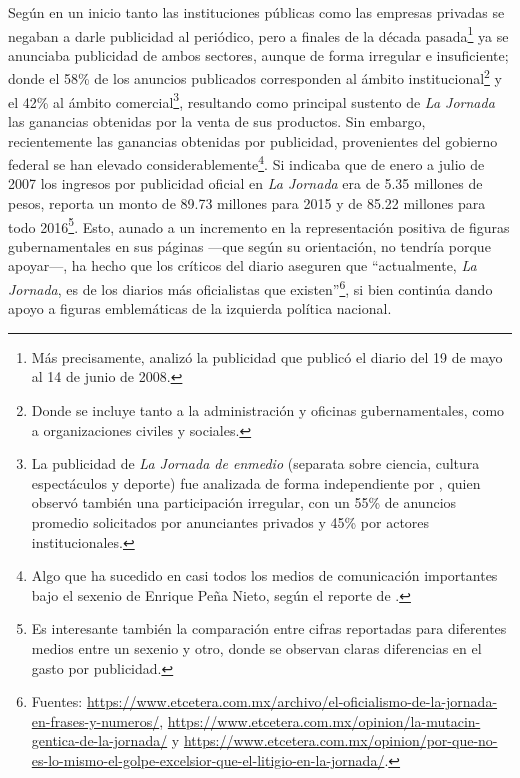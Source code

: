 \documentclass[letterpaper, 11pt]{book}
\theoremstyle{definition}
\theoremstyle{remark}
\begin{document}
Según \citet{2011_Tesis_LaJornada} en un inicio tanto las instituciones públicas como las empresas privadas se negaban a darle publicidad al periódico, pero a finales de la década pasada\footnote{
Más precisamente, \citet{2011_Tesis_LaJornada} analizó la publicidad que publicó el diario del 19 de mayo al 14 de junio de 2008.} ya se anunciaba publicidad de ambos sectores, aunque de forma irregular e insuficiente; donde el 58\% de los anuncios publicados corresponden al ámbito institucional\footnote{
Donde se incluye tanto a la administración y oficinas gubernamentales, como a organizaciones civiles y sociales.} y el 42\% al ámbito comercial\footnote{
La publicidad de \emph{La Jornada de enmedio} (separata sobre ciencia, cultura espectáculos y deporte) fue analizada de forma independiente por \citet{2011_Tesis_LaJornada}, quien observó también una participación irregular, con un 55\% de anuncios promedio solicitados por anunciantes privados y 45\% por actores institucionales.}, resultando como principal sustento de \emph{La Jornada} las ganancias obtenidas por la venta de sus productos. 
Sin embargo, recientemente las ganancias obtenidas por publicidad, provenientes del gobierno federal se han elevado considerablemente\footnote{Algo que ha sucedido en casi todos los medios de comunicación importantes bajo el sexenio de Enrique Peña Nieto, según  el reporte de \citet{2017_FUNDAR_PublicidadOficial}.}. 
Si \citet{2011_Tesis_LaJornada} indicaba que de enero a julio de 2007 los ingresos por publicidad oficial en \emph{La Jornada} era de 5.35 millones de pesos, \citet{2017_FUNDAR_PublicidadOficial} reporta un monto de 89.73 millones para 2015 y de 85.22 millones para todo 2016\footnote{Es interesante también la comparación entre cifras reportadas para diferentes medios entre un sexenio y otro, donde se observan claras diferencias en el gasto por publicidad.}. 
Esto, aunado a un incremento en la representación positiva de figuras gubernamentales en sus páginas ---que según su orientación, no tendría porque apoyar---, ha hecho que los críticos del diario aseguren que ``actualmente, \emph{La Jornada}, es de los diarios más oficialistas que existen''\footnote{
Fuentes: \url{https://www.etcetera.com.mx/archivo/el-oficialismo-de-la-jornada-en-frases-y-numeros/}, \url{https://www.etcetera.com.mx/opinion/la-mutacin-gentica-de-la-jornada/} y \url{https://www.etcetera.com.mx/opinion/por-que-no-es-lo-mismo-el-golpe-excelsior-que-el-litigio-en-la-jornada/}.}, si bien continúa dando apoyo a figuras emblemáticas de la izquierda política nacional.
\end{document}
